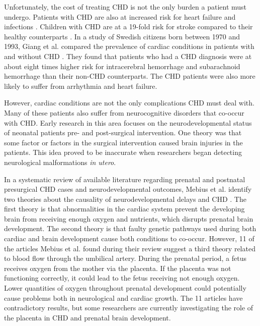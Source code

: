 Unfortunately, the cost of treating CHD is not the only burden a patient must undergo. Patients with CHD are also at increased risk for heart failure and infections \cite{Mozaffarian2016}. Children with CHD are at a 19-fold risk for stroke compared to their healthy counterparts \cite{Fox2015}. In a study of Swedish citizens born between 1970 and 1993, Giang et al. compared the prevalence of cardiac conditions in patients with and without CHD \cite{Giang2018}. They found that patients who had a CHD diagnosis were at about eight times higher risk for intracerebral hemorrhage and subarachnoid hemorrhage than their non-CHD counterparts. The CHD patients were also more likely to suffer from arrhythmia and heart failure. 


However, cardiac conditions are not the only complications CHD must deal with. Many of these patients also suffer from neurocognitive disorders that co-occur with CHD. Early research in this area focuses on the neurodevelopmental status of neonatal patients pre- and post-surgical intervention. One theory was that some factor or factors in the surgical intervention caused brain injuries in the patients. This idea proved to be inaccurate when researchers began detecting neurological malformations \textit{in utero}.

In a systematic review of available literature regarding prenatal and postnatal presurgical CHD cases and neurodevelopmental outcomes, Mebius et al. identify two theories about the causality of neurodevelopmental delays and CHD \cite{Mebius2017}. The first theory is that abnormalities in the cardiac system prevent the developing brain from receiving enough oxygen and nutrients, which disrupts prenatal brain development. The second theory is that faulty genetic pathways used during both cardiac and brain development cause both conditions to co-occur. However, 11 of the articles Mebius et al. found during their review suggest a third theory related to blood flow through the umbilical artery. During the prenatal period, a fetus receives oxygen from the mother via the placenta. If the placenta was not functioning correctly, it could lead to the fetus receiving not enough oxygen. Lower quantities of oxygen throughout prenatal development could potentially cause problems both in neurological and cardiac growth. The 11 articles have contradictory results, but some researchers are currently investigating the role of the placenta in CHD and prenatal brain development.

